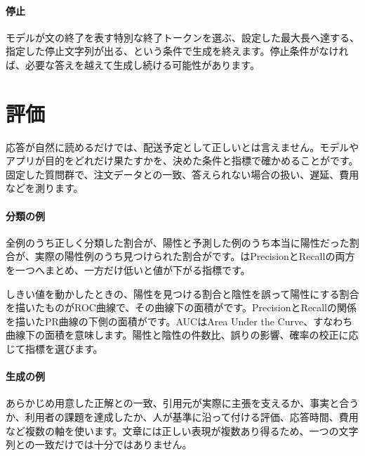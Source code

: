 \par
\endgroup
\medskip
\begingroup
\paragraph{停止}
        モデルが文の終了を表す特別な終了トークンを選ぶ、設定した最大長へ達する、指定した停止文字列が出る、という条件で生成を終えます。停止条件がなければ、必要な答えを越えて生成し続ける可能性があります。

\par
\endgroup
\par
\endgroup


\section{評価}
\label{sec:06-machine-learning-31}

応答が自然に読めるだけでは、配送予定として正しいとは言えません。モデルやアプリが目的をどれだけ果たすかを、決めた条件と指標で確かめることがです。固定した質問群で、注文データとの一致、答えられない場合の扱い、遅延、費用などを測ります。

\begingroup
\begingroup
\paragraph{分類の例}
        全例のうち正しく分類した割合が、陽性と予測した例のうち本当に陽性だった割合が、実際の陽性例のうち見つけられた割合がです。はPrecisionとRecallの両方を一つへまとめ、一方だけ低いと値が下がる指標です。

        しきい値を動かしたときの、陽性を見つける割合と陰性を誤って陽性にする割合を描いたものがROC曲線で、その曲線下の面積がです。PrecisionとRecallの関係を描いたPR曲線の下側の面積がです。AUCはArea Under the Curve、すなわち曲線下の面積を意味します。陽性と陰性の件数比、誤りの影響、確率の校正に応じて指標を選びます。

\paragraph{生成の例}
        あらかじめ用意した正解との一致、引用元が実際に主張を支えるか、事実と合うか、利用者の課題を達成したか、人が基準に沿って付ける評価、応答時間、費用など複数の軸を使います。文章には正しい表現が複数あり得るため、一つの文字列との一致だけでは十分ではありません。

\par
\endgroup
\medskip
\begingroup
